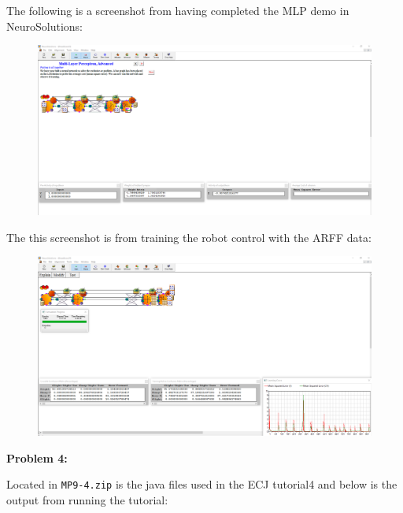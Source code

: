 \documentclass{amsart}
\theoremstyle{definition}
\begin{document}
The following is a screenshot from having completed the MLP demo in NeuroSolutions:

\begin{figure}[h!]
    \includegraphics[width=0.9\linewidth]{mp9-3_0}
\end{figure}


The this screenshot is from training the robot control with the ARFF data:

\begin{figure}[h!]
    \includegraphics[width=0.9\linewidth]{mp9-3_1}
\end{figure}


\bigbreak
\textbf{Problem 4:}
\bigbreak

Located in {\tt MP9-4.zip} is the java files used in the ECJ tutorial4 and below is the output from running the tutorial:
\end{document}
